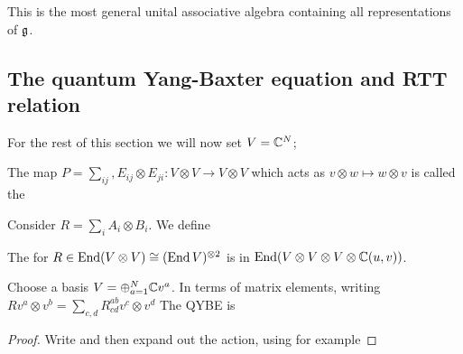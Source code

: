 \documentclass{article}
\begin{document}
\begin{remark}
This is the most general unital associative algebra containing all representations of $\mathfrak{g}$. 
\end{remark}

\subsection{The quantum Yang-Baxter equation and RTT relation}

For the rest of this section we will now set $V = \mathbb{C}^N$;

\begin{definition}
The map $P = \sum_{ij}, E_{ij} \otimes E_{ji} : V \otimes V \to V \otimes V$ which acts as $ v \otimes w \mapsto w \otimes v$ is called the 
\end{definition}

Consider $R = \sum_i A_i \otimes B_i$. We define 
\begin{definition}
The  for $R\in \operatorname{End}(V \otimes V) \cong (\operatorname{End} V)^{\otimes 2}$ is 
in $\operatorname{End}(V \otimes V \otimes V \otimes \mathbb{C}(u,v))$. 
\end{definition}

\begin{prop}
Choose a basis $V = \oplus_{a=1}^N \mathbb{C} v^a$. In terms of matrix elements, writing $R v^a \otimes v^b = \sum_{c,d} R^{ab}_{cd} v^c \otimes v^d$ The QYBE is 
\end{prop}
\begin{proof}
Write 
and then expand out the action, using for example 
\end{proof}
\end{document}
